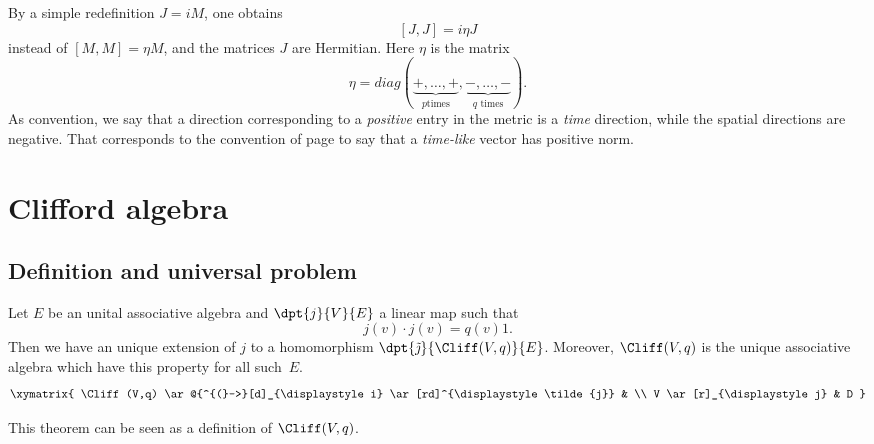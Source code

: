 By a simple redefinition $J=iM$, one obtains
\begin{equation}            \label{EqJJietaJcomm}
    [J,J]=i\eta J
\end{equation}
instead of $[M,M]=\eta M$, and the matrices $J$ are Hermitian. Here $\eta$ is the matrix 
\begin{equation}
\eta=diag(\underbrace{+,\ldots,+}_{p \text{times}},\underbrace{-,\ldots,-}_{\text{$q$ times}}). 
\end{equation}
As convention, we say that a direction corresponding to a \emph{positive} entry in the metric is a \emph{time} direction, while the spatial directions are negative. That corresponds to the convention of page \pageref{PgDefsGenre} to say that a \emph{time-like} vector has positive norm.

\section{Clifford algebra}

\subsection{Definition and universal problem}


\begin{theorem}
Let $E$ be an unital associative algebra and $\dpt{j}{V}{E}$ a linear map such that
\begin{equation}
    j(v)\cdot j(v)=q(v)1.        \label{102r1}
\end{equation}
Then we have an unique extension of $j$ to a homomorphism $\dpt{\tilde\jmath}{\Cliff(V,q)}{E}$. Moreover, $\Cliff(V,q)$ is the unique associative algebra which have this property for all such~$E$.
\[
\xymatrix{
    \Cliff(V,q) \ar@{^{(}->}[d]_{\displaystyle i} \ar[rd]^{\displaystyle\tilde{j}} &  \\
    V \ar[r]_{\displaystyle j} & D
  }
\]
\label{tho_Cliffunif}
\end{theorem}
This theorem can be seen as a definition of $\Cliff(V,q)$.


